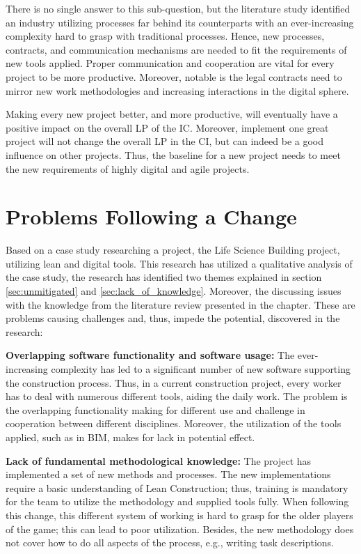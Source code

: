 There is no single answer to this sub-question, but the literature study identified an industry utilizing processes far behind its counterparts with an ever-increasing complexity hard to grasp with traditional processes. Hence, new processes, contracts, and communication mechanisms are needed to fit the requirements of new tools applied. Proper communication and cooperation are vital for every project to be more productive. Moreover, notable is the legal contracts need to mirror new work methodologies and increasing interactions in the digital sphere.

Making every new project better, and more productive, will eventually have a positive impact on the overall LP of the IC. Moreover, implement one great project will not change the overall LP in the CI, but can indeed be a good influence on other projects. Thus, the baseline for a new project needs to meet the new requirements of highly digital and agile projects.

\section{Problems Following a Change} \label{sec:rq2}
Based on a case study researching a project, the Life Science Building project, utilizing lean and digital tools. This research has utilized a qualitative analysis of the case study, the research has identified two themes explained in section \ref{sec:unmitigated} and \ref{sec:lack_of_knowledge}. Moreover, the discussing issues with the knowledge from the literature review presented in the  chapter. These are problems causing challenges and, thus, impede the potential, discovered in the research:
    
{\bf Overlapping software functionality and software usage:} The ever-increasing complexity has led to a significant number of new software supporting the construction process. Thus, in a current construction project, every worker has to deal with numerous different tools, aiding the daily work. The problem is the overlapping functionality making for different use and challenge in cooperation between different disciplines. Moreover, the utilization of the tools applied, such as in BIM, makes for lack in potential effect.  
    
{\bf Lack of fundamental methodological knowledge:} The project has implemented a set of new methods and processes. The new implementations require a basic understanding of Lean Construction; thus, training is mandatory for the team to utilize the methodology and supplied tools fully. When following this change, this different system of working is hard to grasp for the older players of the game; this can lead to poor utilization. Besides, the new methodology does not cover how to do all aspects of the process, e.g., writing task descriptions.

